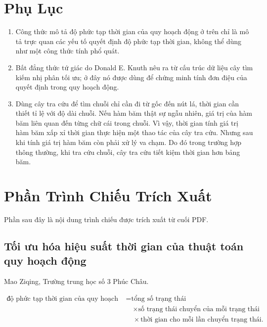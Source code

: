 \documentclass[11pt]{article}
\begin{document}
\section*{Phụ Lục}

\begin{enumerate}
  \item Công thức mô tả độ phức tạp thời gian của quy hoạch động ở trên chỉ
  là mô tả trực quan các yếu tố quyết định độ phức tạp thời gian, không thể
  dùng như một công thức tính phổ quát.
  \item Bất đẳng thức tứ giác do Donald E. Knuth nêu ra từ cấu trúc dữ liệu
  cây tìm kiếm nhị phân tối ưu; ở đây nó được dùng để chứng minh tính đơn điệu
  của quyết định trong quy hoạch động.
  \item Dùng cây tra cứu để tìm chuỗi chỉ cần đi từ gốc đến nút lá, thời gian
  cần thiết tỉ lệ với độ dài chuỗi. Nếu hàm băm thật sự ngẫu nhiên, giá trị
  của hàm băm liên quan đến từng chữ cái trong chuỗi. Vì vậy, thời gian tính
  giá trị hàm băm xấp xỉ thời gian thực hiện một thao tác của cây tra cứu.
  Nhưng sau khi tính giá trị hàm băm còn phải xử lý va chạm. Do đó trong
  trường hợp thông thường, khi tra cứu chuỗi, cây tra cứu tiết kiệm thời gian
  hơn bảng băm.
\end{enumerate}

\section*{Phần Trình Chiếu Trích Xuất}

Phần sau đây là nội dung trình chiếu được trích xuất từ cuối PDF.

\subsection*{Tối ưu hóa hiệu suất thời gian của thuật toán quy hoạch động}

Mao Ziqing, Trường trung học số 3 Phúc Châu.

\[
\begin{aligned}
\text{độ phức tạp thời gian của quy hoạch động}
&= \text{tổng số trạng thái}\\
&\quad \times \text{số trạng thái chuyển của mỗi trạng thái}\\
&\quad \times \text{thời gian cho mỗi lần chuyển trạng thái}.
\end{aligned}
\]
\end{document}
